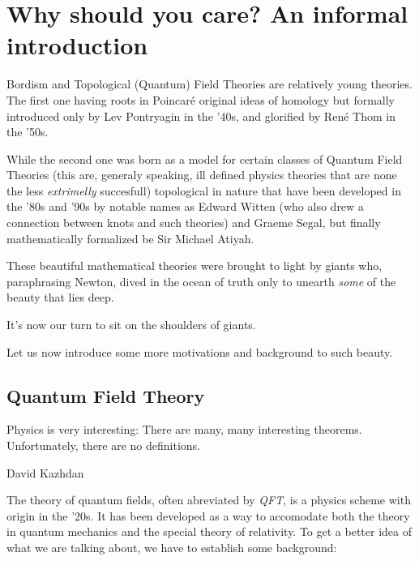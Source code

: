 \newpage
\clearpage
{}



\chapter{Why should you care? An informal introduction}
Bordism and Topological (Quantum) Field Theories are relatively young theories. The first one having roots in Poincaré original ideas of homology but formally introduced only by Lev Pontryagin in the '40s, and glorified by René Thom in the '50s. 

\noindent While the second one was born as a model for certain classes of Quantum Field Theories (this are, generaly speaking, ill defined physics theories that are none the less \textit{extrimelly} succesfull) topological in nature that have been developed in the '80s and '90s by notable names as Edward Witten (who also drew a connection between knots and such theories) and Graeme Segal, but finally mathematically formalized be Sir Michael Atiyah.

\noindent These beautiful mathematical theories were brought to light by giants who, paraphrasing Newton, dived in the ocean of truth only to unearth \textit{some} of the beauty that lies deep.

\noindent It's now our turn to sit on the shoulders of giants.



Let us now introduce some more motivations and background to such beauty.
\section{Quantum Field Theory}
\epigraph{Physics is very interesting:
There are many, many interesting theorems.
Unfortunately, there are no
definitions.}{David Kazhdan}
\noindent The theory of quantum fields, often abreviated by \textit{QFT}, is a physics scheme with origin in the '20s. It has been developed as a way to accomodate both the theory in quantum mechanics and the special theory of relativity. To get a better idea of what we are talking about, we have to establish some background:

